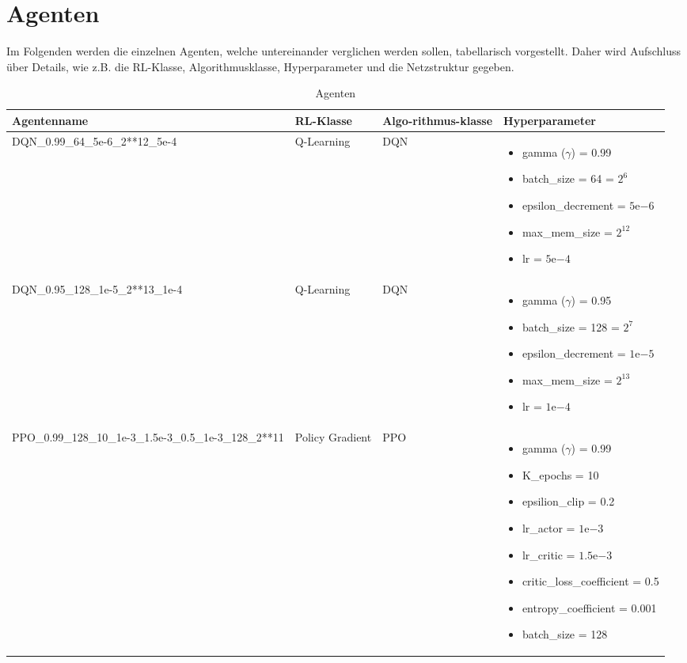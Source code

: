 \section{Agenten}
Im Folgenden werden die einzelnen Agenten, welche untereinander verglichen werden sollen, tabellarisch vorgestellt. Daher wird Aufschluss über Details, wie z.B. die RL-Klasse, Algorithmusklasse, Hyperparameter und die Netzstruktur gegeben.
\begin{longtable}[h]{|p{3.5cm}|p{2.5cm}|p{1.5cm}|p{6cm}|}
	\caption{Agenten}
	\label{tab:Agenten} 
	\endfirsthead
	\endhead
	\hline
	Agentenname & RL-Klasse & Algo-rithmus-klasse & Hyperparameter \\
	\hline
	DQN\_0.99\_64\_5e-6\_2**12\_5e-4 & Q-Learning & DQN & 
	\begin{itemize}
		\item gamma ($\gamma$) =  0.99
		\item batch\_size = 64 = $2^{6}$
		\item epsilon\_decrement = $5\mathrm{e}{-6}$
		\item max\_mem\_size = $2^{12}$
		\item lr = $5\mathrm{e}{-4}$
	\end{itemize} 
	\\
	\hline
	DQN\_0.95\_128\_1e-5\_2**13\_1e-4 & Q-Learning & DQN & 
	\begin{itemize}
		\item gamma ($\gamma$) =  0.95
		\item batch\_size = 128 = $2^{7}$
		\item epsilon\_decrement = $1\mathrm{e}{-5}$
		\item max\_mem\_size = $2^{13}$
		\item lr = $1\mathrm{e}{-4}$
	\end{itemize} 
	\\
	\hline
	PPO\_0.99\_128\_10\_1e-3\_1.5e-3\_0.5\_1e-3\_128\_2**11 & Policy Gradient & PPO & 
	\begin{itemize}
		\item gamma ($\gamma$) =  0.99
		\item K\_epochs = 10
		\item epsilion\_clip = 0.2
		\item lr\_actor = $1\mathrm{e}{-3}$
		\item lr\_critic = $1.5\mathrm{e}{-3}$
		\item critic\_loss\_coefficient = 0.5
		\item entropy\_coefficient = 0.001
		\item batch\_size = 128

\end{itemize}
\end{longtable}
